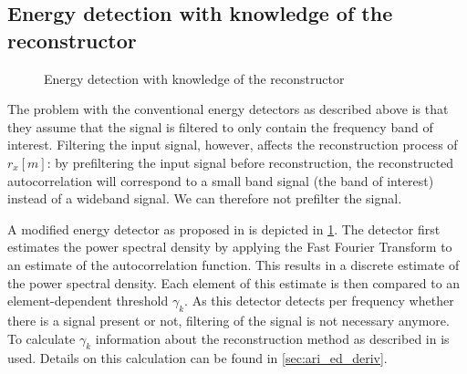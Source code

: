 \documentclass[a4paper, openany, oneside]{memoir}
\begin{document}
\subsection{Energy detection with knowledge of the reconstructor}\label{ssec:ari_ed}
\begin{figure}[H]
\centering
{}
\caption{Energy detection with knowledge of the reconstructor}\label{tkz:ed_ari_overview}
\end{figure}
The problem with the conventional energy detectors as described above is that they assume that the signal is filtered to only contain the frequency band of interest. Filtering the input signal, however, affects the reconstruction process of $r_x[m]$: by prefiltering the input signal before reconstruction, the reconstructed autocorrelation will correspond to a small band signal (the band of interest) instead of a wideband signal. We can therefore not prefilter the signal.

A modified energy detector as proposed in \cite{ariananda2012compressive} is depicted in \cref{tkz:ed_ari_overview}. The detector first estimates the power spectral density by applying the Fast Fourier Transform to an estimate of the autocorrelation function. This results in a discrete estimate of the power spectral density. Each element of this estimate is then compared to an element-dependent threshold $\gamma_k$. As this detector detects per frequency whether there is a signal present or not, filtering of the signal is not necessary anymore.
To calculate $\gamma_k$ information about the reconstruction method as described in  is used. Details on this calculation can be found in \cref{sec:ari_ed_deriv}.
\end{document}
